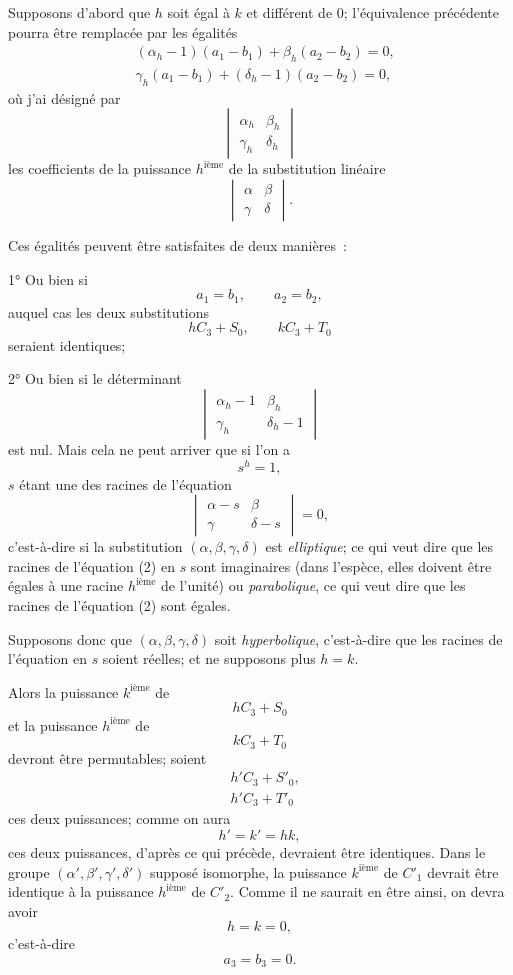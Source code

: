 \documentclass{article}
\begin{document}
Supposons d'abord que $h$ soit égal à $k$ et différent de 0; l'équivalence précédente pourra être remplacée par les égalités
\[ \begin{aligned} &(\alpha_{h} - 1)(a_{1} - b_{1}) + \beta_{h}(a_{2} - b_{2}) = 0,\\ &\gamma_{h}(a_{1} - b_{1}) + (\delta_{h} - 1)(a_{2} - b_{2}) = 0, \end{aligned} \]
où j'ai désigné par
\[ \begin{vmatrix} \alpha_{h} & \beta_{h} \\[1ex] \gamma_{h} & \delta_{h} \end{vmatrix} \]
les coefficients de la puissance $h^{\text{ième}}$ de la substitution linéaire
\[ \begin{vmatrix} \alpha & \beta \\[1ex] \gamma & \delta \end{vmatrix}. \]

Ces égalités peuvent être satisfaites de deux manières~:

1° Ou bien si
\[ a_{1} = b_{1}, \qquad a_{2} = b_{2}, \]
auquel cas les deux substitutions
\[ hC_{3} + S_{0}, \qquad kC_{3} + T_{0} \]
seraient identiques;

2° Ou bien si le déterminant
\[ \begin{vmatrix} \alpha_{h} - 1 & \beta_{h} \\[1ex] \gamma_{h} & \delta_{h} - 1 \end{vmatrix} \]
est nul. Mais cela ne peut arriver que si l'on a
\[ s^{h} = 1, \]
$s$ étant une des racines de l'équation
\[ \begin{vmatrix} \alpha - s & \beta \\[1ex] \gamma & \delta - s \end{vmatrix} = 0, \tag{2} \]
c'est-à-dire si la substitution $(\alpha, \beta, \gamma, \delta)$ est \emph{elliptique}; ce qui veut dire que les racines de l'équation (2) en $s$ sont imaginaires (dans l'espèce, elles doivent être égales à une racine $h^{\text{ième}}$ de l'unité) ou \emph{parabolique}, ce qui veut dire que les racines de l'équation (2) sont égales.

Supposons donc que $(\alpha, \beta, \gamma, \delta)$ soit \emph{hyperbolique}, c'est-à-dire que les racines de l'équation en $s$ soient réelles; et ne supposons plus $h = k$.

Alors la puissance $k^{\text{ième}}$ de
\[ hC_{3} + S_{0} \]
et la puissance $h^{\text{ième}}$ de
\[ kC_{3} + T_{0} \]
devront être permutables; soient
\[ \begin{aligned} &h'C_{3} + S'_{0},\\ &h'C_{3} + T'_{0} \end{aligned} \]
ces deux puissances; comme on aura
\[ h' = k' = hk, \]
ces deux puissances, d'après ce qui précède, devraient être identiques. Dans le groupe $(\alpha', \beta', \gamma', \delta')$ supposé isomorphe, la puissance $k^{\text{ième}}$ de $C'_{1}$
devrait être identique à la puissance $h^{\text{ième}}$ de $C'_{2}$. Comme il ne saurait en être ainsi, on devra avoir
\[ h = k = 0, \]
c'est-à-dire
\[ a_{3} = b_{3} = 0. \]
\end{document}
